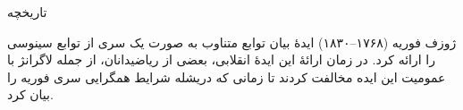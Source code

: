 \begin{EMjoin}

\begin{EMunit}


\end{EMunit}

\begin{EMproof}{}


\end{EMproof}

\end{EMjoin}

\begin{EMjoin}

\begin{EMunit}


\end{EMunit}

\begin{EMproof}{}


\end{EMproof}

\end{EMjoin}

\EMhold


\begin{EMremark}{تاریخچه}

ژوزف فوریه (۱۷۶۸--۱۸۳۰) ایدهٔ بیان توابع متناوب به صورت یک سری از توابع سینوسی را ارائه کرد. در زمان ارائهٔ این ایدهٔ انقلابی، بعضی از ریاضیدانان، از جمله لاگرانژ با عمومیت این ایده مخالفت کردند تا زمانی که دریشله شرایط همگرایی سری فوریه را بیان کرد.

\end{EMremark}

